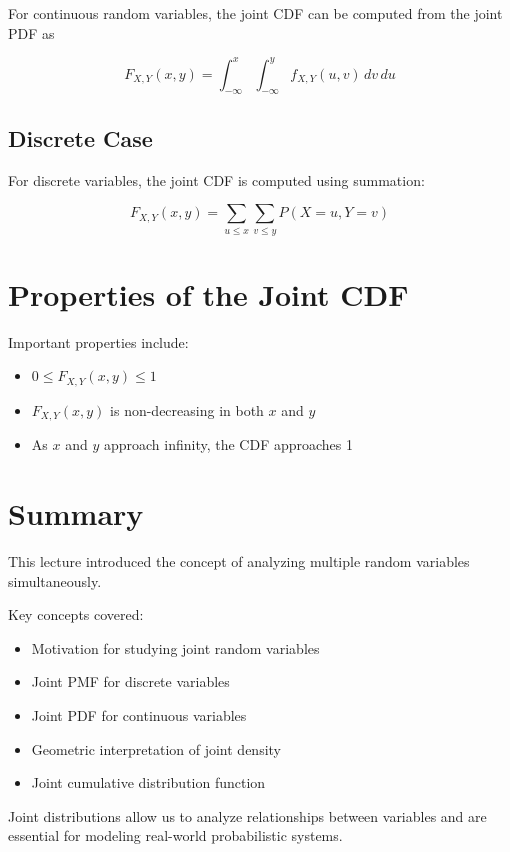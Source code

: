 \documentclass[12pt]{article}
\begin{document}
For continuous random variables, the joint CDF can be computed from the joint PDF as

\[
F_{X,Y}(x,y) =
\int_{-\infty}^{x}
\int_{-\infty}^{y}
f_{X,Y}(u,v)\,dv\,du
\]

\subsection{Discrete Case}

For discrete variables, the joint CDF is computed using summation:

\[
F_{X,Y}(x,y) =
\sum_{u \le x}
\sum_{v \le y}
P(X=u, Y=v)
\]

\section{Properties of the Joint CDF}

Important properties include:

\begin{itemize}
\item \(0 \le F_{X,Y}(x,y) \le 1\)
\item \(F_{X,Y}(x,y)\) is non-decreasing in both \(x\) and \(y\)
\item As \(x\) and \(y\) approach infinity, the CDF approaches 1
\end{itemize}

\section{Summary}

This lecture introduced the concept of analyzing multiple random variables simultaneously.

Key concepts covered:

\begin{itemize}
\item Motivation for studying joint random variables
\item Joint PMF for discrete variables
\item Joint PDF for continuous variables
\item Geometric interpretation of joint density
\item Joint cumulative distribution function
\end{itemize}

Joint distributions allow us to analyze relationships between variables and are essential for modeling real-world probabilistic systems.
\end{document}
